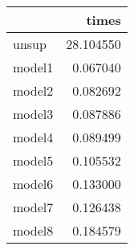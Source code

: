 \begin{tabular}{lr}
\toprule
{} &      times \\
\midrule
unsup  &  28.104550 \\
model1 &   0.067040 \\
model2 &   0.082692 \\
model3 &   0.087886 \\
model4 &   0.089499 \\
model5 &   0.105532 \\
model6 &   0.133000 \\
model7 &   0.126438 \\
model8 &   0.184579 \\
\bottomrule
\end{tabular}
